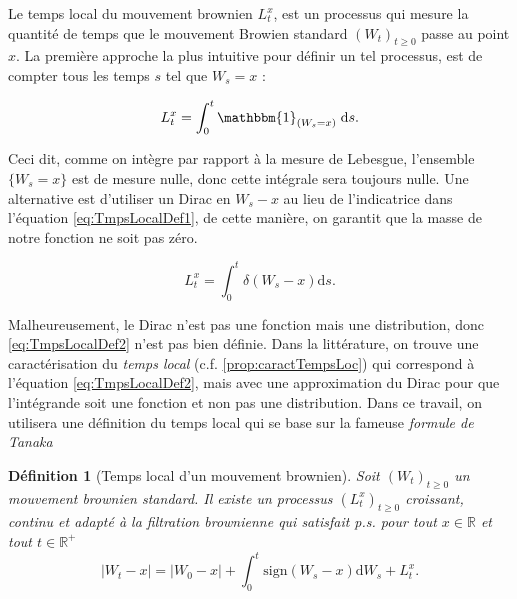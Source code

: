 \documentclass[openany]{book}
\newcommand{\R}{\mathbb{R}}
\newcommand{\1}{\mathbbm{1}}
\newcommand{\sign}{\text{sign}}
\renewcommand{\d}{\mathrm{d}}
\theoremstyle{thmfont}
\theoremstyle{deffont}
\newtheorem{definition}[definition]{Définition}
\theoremstyle{thmfont}
\theoremstyle{deffont}
\begin{document}
Le temps local du mouvement brownien $L_t^x$, est un processus qui mesure la quantité de temps que le mouvement Browien standard $(W_t)_{t\geq0}$ passe au point $x$.
La première approche la plus intuitive pour définir un tel processus, est de compter tous les temps $s$ tel que $W_s = x$ :

\begin{equation}
  \label{eq:TmpsLocalDef1}
   L^x_t= \int_0^t\1_{(W_s=x)}\;\d s.
  \end{equation}

Ceci dit, comme on intègre par rapport à la mesure de Lebesgue, l'ensemble $\{W_s = x\}$ est de mesure nulle, donc cette intégrale sera toujours nulle. Une alternative est d'utiliser un Dirac en $W_s - x$ au lieu de l'indicatrice dans l'équation \eqref{eq:TmpsLocalDef1}, de cette manière, on garantit que la masse de notre fonction ne soit pas zéro.

\begin{equation}
  \label{eq:TmpsLocalDef2}
  L^x_t= \int_0^t\delta(W_s-x)\d s.
\end{equation}

Malheureusement, le Dirac n'est pas une fonction mais une distribution, donc \eqref{eq:TmpsLocalDef2} n'est pas bien définie. Dans la littérature, on trouve une caractérisation du \textit{temps local} (c.f. \autoref{prop:caractTempsLoc}) qui correspond à l'équation \eqref{eq:TmpsLocalDef2}, mais avec une approximation du Dirac pour que l'intégrande soit une fonction et non pas une distribution. Dans ce travail, on utilisera une définition du temps local qui se base sur la fameuse \textit{formule de Tanaka}\\

\begin{definition}[Temps local d'un mouvement brownien]
  \label{def:TempsLoc}
  Soit $(W_t)_{t\geq0}$ un mouvement brownien standard. Il existe un processus $(L_t^x)_{t\geq0}$ croissant, continu et adapté à la filtration brownienne qui satisfait p.s. pour tout $x \in \R$ et tout $t \in \R^+$
  \begin{equation}
    |W_t -x|  = |W_0-x| + \int_0^t\sign(W_s - x)\d W_s + L_t^x.
    \label{eq:tempsLocDef}
  \end{equation}
\end{definition}
\end{document}
